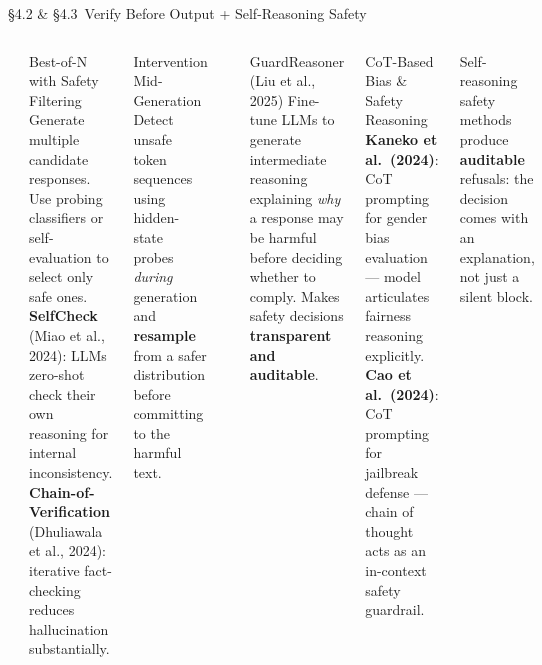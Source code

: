 \begin{frame}{\S4.2 \& \S4.3\ Verify Before Output + Self-Reasoning Safety}
  \begin{columns}[T]
    {\small\bfseries{}}
    \begin{ucrcard}[UCRnavy]{Best-of-N with Safety Filtering}
      \scriptsize
      Generate multiple candidate responses. Use probing classifiers or self-evaluation to select only safe ones.\\[3pt]
      \textbf{SelfCheck} (Miao et al., 2024): LLMs zero-shot check their own reasoning for internal inconsistency.\\[3pt]
      \textbf{Chain-of-Verification} (Dhuliawala et al., 2024): iterative fact-checking reduces hallucination substantially.
    \end{ucrcard}
    \vspace{0.3em}
    \begin{ucrcard}[UCRnavy]{Intervention Mid-Generation}
      \scriptsize
      Detect unsafe token sequences using hidden-state probes \emph{during} generation and \textbf{resample} from a safer distribution before committing to the harmful text.
    \end{ucrcard}

    {\small\bfseries{}}
    \begin{ucrcard}[UCRnavy]{GuardReasoner (Liu et al., 2025)}
      \scriptsize
      Fine-tune LLMs to generate intermediate reasoning explaining \emph{why} a response may be harmful before deciding whether to comply. Makes safety decisions \textbf{transparent and auditable}.
    \end{ucrcard}
    \vspace{0.3em}
    \begin{ucrcard}[UCRnavy]{CoT-Based Bias \& Safety Reasoning}
      \scriptsize
      \textbf{Kaneko et al.\ (2024)}: CoT prompting for gender bias evaluation --- model articulates fairness reasoning explicitly.\\[3pt]
      \textbf{Cao et al.\ (2024)}: CoT prompting for jailbreak defense --- chain of thought acts as an in-context safety guardrail.
    \end{ucrcard}
    \vspace{0.2em}
    \begin{ucrdark}[UCRnavy]
      \centering\scriptsize
      Self-reasoning safety methods produce \textbf{auditable} refusals: the decision comes with an explanation, not just a silent block.
    \end{ucrdark}
  \end{columns}
\end{frame}


